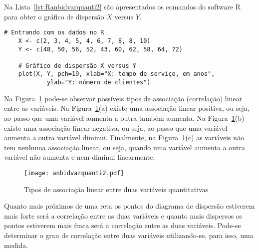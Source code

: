 \documentclass[11pt,fleqn]{book} %
\begin{document}
\vspace{4cm}

Na Lista~\ref{lst:Ranbidvarquanti2} são apresentados os comandos do software R para obter o gráfico de dispersão $X$ versus $Y$.\\

\begin{scriptsize}
	\estiloR
	\begin{lstlisting}[caption={Comandos do software R}, label=lst:Ranbidvarquanti2]
	# Entrando com os dados no R
	X <- c(2, 3, 4, 5, 4, 6, 7, 8, 8, 10)
	Y <- c(48, 50, 56, 52, 43, 60, 62, 58, 64, 72)
	
	# Gráfico de dispersão X versus Y
	plot(X, Y, pch=19, xlab="X: tempo de serviço, em anos", 
			ylab="Y: número de clientes")

	\end{lstlisting}
\end{scriptsize}


Na Figura~\ref{fig:anbidvarquanti2} pode-se observar possíveis tipos de associação (correlação) linear entre as variáveis. Na Figura~\ref{fig:anbidvarquanti2}(a) existe uma associação linear positiva, ou seja, ao passo que uma variável aumenta a outra também aumenta. Na Figura~\ref{fig:anbidvarquanti2}(b) existe uma associação linear negativa, ou seja, ao passo que uma variável aumenta a outra variável diminui. Finalmente, na Figura~\ref{fig:anbidvarquanti2}(c) as variáveis não tem nenhuma associação linear, ou seja, quando uma variável aumenta a outra variável não aumenta e nem diminui linearmente. \\


\begin{figure}[h!]
\centering\texttt{[image: anbidvarquanti2.pdf]}
\setlength{\abovecaptionskip}{0.5pt}
\caption{Tipos de associação linear entre duas variáveis quantitativas}
\label{fig:anbidvarquanti2} %
\vspace{0.5cm}
\end{figure}


Quanto mais próximos de uma reta os pontos do diagrama de dispersão estiverem mais forte será a correlação entre as duas variáveis e quanto mais dispersos os pontos estiverem mais fraca será a correlação entre as duas variáveis. Pode-se determinar o grau de correlação entre duas variáveis utilizando-se, para isso, uma medida. \\
\end{document}
